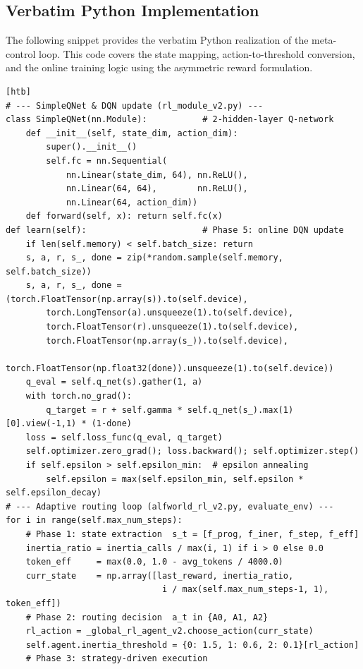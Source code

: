 \documentclass[runningheads]{llncs}
\begin{document}
\subsection{Verbatim Python Implementation}
The following snippet provides the verbatim Python realization of the meta-control loop. This code covers the state mapping, action-to-threshold conversion, and the online training logic using the asymmetric reward formulation.

\begin{lstlisting}[style=lncs,
  caption={AdaInertia core implementation (condensed).},
  label={lst:adainertia}][htb]
# --- SimpleQNet & DQN update (rl_module_v2.py) ---
class SimpleQNet(nn.Module):           # 2-hidden-layer Q-network
    def __init__(self, state_dim, action_dim):
        super().__init__()
        self.fc = nn.Sequential(
            nn.Linear(state_dim, 64), nn.ReLU(),
            nn.Linear(64, 64),        nn.ReLU(),
            nn.Linear(64, action_dim))
    def forward(self, x): return self.fc(x)
def learn(self):                       # Phase 5: online DQN update
    if len(self.memory) < self.batch_size: return
    s, a, r, s_, done = zip(*random.sample(self.memory, self.batch_size))
    s, a, r, s_, done = (torch.FloatTensor(np.array(s)).to(self.device),
        torch.LongTensor(a).unsqueeze(1).to(self.device),
        torch.FloatTensor(r).unsqueeze(1).to(self.device),
        torch.FloatTensor(np.array(s_)).to(self.device),
        torch.FloatTensor(np.float32(done)).unsqueeze(1).to(self.device))
    q_eval = self.q_net(s).gather(1, a)
    with torch.no_grad():
        q_target = r + self.gamma * self.q_net(s_).max(1)[0].view(-1,1) * (1-done)
    loss = self.loss_func(q_eval, q_target)
    self.optimizer.zero_grad(); loss.backward(); self.optimizer.step()
    if self.epsilon > self.epsilon_min:  # epsilon annealing
        self.epsilon = max(self.epsilon_min, self.epsilon * self.epsilon_decay)
# --- Adaptive routing loop (alfworld_rl_v2.py, evaluate_env) ---
for i in range(self.max_num_steps):
    # Phase 1: state extraction  s_t = [f_prog, f_iner, f_step, f_eff]
    inertia_ratio = inertia_calls / max(i, 1) if i > 0 else 0.0
    token_eff     = max(0.0, 1.0 - avg_tokens / 4000.0)
    curr_state    = np.array([last_reward, inertia_ratio,
                               i / max(self.max_num_steps-1, 1), token_eff])
    # Phase 2: routing decision  a_t in {A0, A1, A2}
    rl_action = _global_rl_agent_v2.choose_action(curr_state)
    self.agent.inertia_threshold = {0: 1.5, 1: 0.6, 2: 0.1}[rl_action]
    # Phase 3: strategy-driven execution

\end{lstlisting}
\end{document}
